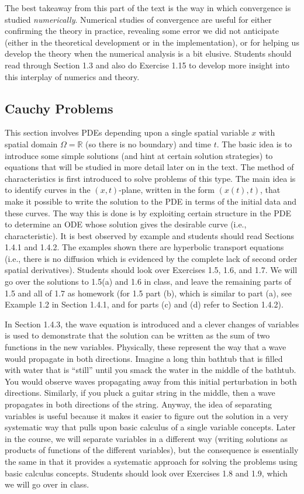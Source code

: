 \documentclass{amsart}
\theoremstyle{plain}
\theoremstyle{definition}
\theoremstyle{remark}
\theoremstyle{definition}
\numberwithin{equation}{section}
\numberwithin{equation}{section}
\begin{document}
The best takeaway from this part of the text is the way in which convergence is studied {\em numerically}.
Numerical studies of convergence are useful for either confirming the theory in practice, revealing some error we did not anticipate (either in the theoretical development or in the implementation), or for helping us develop the theory when the numerical analysis is a bit elusive. 
Students should read through Section 1.3 and also do Exercise 1.15 to develop more insight into this interplay of numerics and theory. 

\subsection{Cauchy Problems}

This section involves PDEs depending upon a single spatial variable $x$ with spatial domain $\Omega=\mathbb{R}$ (so there is no boundary) and time $t$.
The basic idea is to introduce some simple solutions (and hint at certain solution strategies) to equations that will be studied in more detail later on in the text.
The method of characteristics is first introduced to solve problems of this type. 
The main idea is to identify curves in the $(x,t)$-plane, written in the form $(x(t),t)$, that make it possible to write the solution to the PDE in terms of the initial data and these curves. 
The way this is done is by exploiting certain structure in the PDE to determine an ODE whose solution gives the desirable curve (i.e., characteristic). 
It is best observed by example and students should read Sections 1.4.1 and 1.4.2.
The examples shown there are hyperbolic transport equations (i.e., there is no diffusion which is evidenced by the complete lack of second order spatial derivatives). 
Students should look over Exercises 1.5, 1.6, and 1.7. 
We will go over the solutions to 1.5(a) and 1.6 in class, and leave the remaining parts of 1.5 and all of 1.7 as homework (for 1.5 part (b), which is similar to part (a), see Example 1.2 in Section 1.4.1, and for parts (c) and (d) refer to Section 1.4.2).


In Section 1.4.3, the wave equation is introduced and a clever changes of variables is used to demonstrate that the solution can be written as the sum of two functions in the new variables. 
Physically, these represent the way that a wave would propagate in both directions.
Imagine a long thin bathtub that is filled with water that is ``still'' until you smack the water in the middle of the bathtub.
You would observe waves propagating away from this initial perturbation in both directions.
Similarly, if you pluck a guitar string in the middle, then a wave propagates in both directions of the string.
Anyway, the idea of separating variables is useful because it makes it easier to figure out the solution in a very systematic way that pulls upon basic calculus of a single variable concepts. 
Later in the course, we will separate variables in a different way (writing solutions as products of functions of the different variables), but the consequence is essentially the same in that it provides a systematic approach for solving the problems using basic calculus concepts. 
Students should look over Exercises 1.8 and 1.9, which we will go over in class. 
\end{document}
